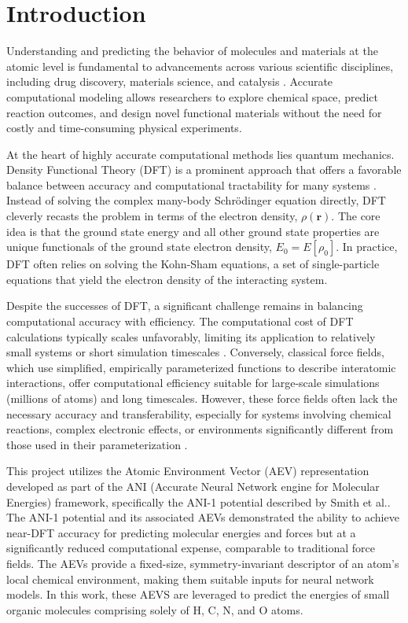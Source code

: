 \section{Introduction}

Understanding and predicting the behavior of molecules and materials at the atomic level is fundamental to advancements across various scientific disciplines, including drug discovery, materials science, and catalysis \cite{wang2018silico, dominy2004native, cicaloni2019applications}. Accurate computational modeling allows researchers to explore chemical space, predict reaction outcomes, and design novel functional materials without the need for costly and time-consuming physical experiments.

At the heart of highly accurate computational methods lies quantum mechanics. Density Functional Theory (DFT) is a prominent approach that offers a favorable balance between accuracy and computational tractability for many systems \cite{engel2011density}. Instead of solving the complex many-body Schrödinger equation directly, DFT cleverly recasts the problem in terms of the electron density, $\rho(\mathbf{r})$. The core idea is that the ground state energy and all other ground state properties are unique functionals of the ground state electron density, $E_0 = E[\rho_0]$. In practice, DFT often relies on solving the Kohn-Sham equations, a set of single-particle equations that yield the electron density of the interacting system.

Despite the successes of DFT, a significant challenge remains in balancing computational accuracy with efficiency. The computational cost of DFT calculations typically scales unfavorably, limiting its application to relatively small systems or short simulation timescales \cite{engel2011density, cohen2012challenges}. Conversely, classical force fields, which use simplified, empirically parameterized functions to describe interatomic interactions, offer computational efficiency suitable for large-scale simulations (millions of atoms) and long timescales. However, these force fields often lack the necessary accuracy and transferability, especially for systems involving chemical reactions, complex electronic effects, or environments significantly different from those used in their parameterization \cite{herbers2013grand}.

This project utilizes the Atomic Environment Vector (AEV) representation developed as part of the ANI (Accurate Neural Network engine for Molecular Energies) framework, specifically the ANI-1 potential described by Smith et al.. \cite{smith2017ani} The ANI-1 potential and its associated AEVs demonstrated the ability to achieve near-DFT accuracy for predicting molecular energies and forces but at a significantly reduced computational expense, comparable to traditional force fields. The AEVs provide a fixed-size, symmetry-invariant descriptor of an atom's local chemical environment, making them suitable inputs for neural network models. In this work, these AEVS are leveraged to predict the energies of small organic molecules comprising solely of H, C, N, and O atoms.

